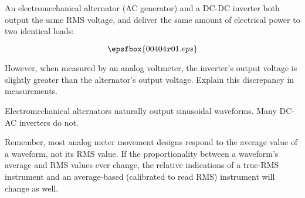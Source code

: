 

An electromechanical alternator (AC generator) and a DC-DC inverter both output the same RMS voltage, and deliver the same amount of electrical power to two identical loads:

$$\epsfbox{00404x01.eps}$$

However, when measured by an analog voltmeter, the inverter's output voltage is slightly greater than the alternator's output voltage.  Explain this discrepancy in measurements.







Electromechanical alternators naturally output sinusoidal waveforms.  Many DC-AC inverters do not.







Remember, most analog meter movement designs respond to the average value of a waveform, not its RMS value.  If the proportionality between a waveform's average and RMS values ever change, the relative indications of a true-RMS instrument and an average-based (calibrated to read RMS) instrument will change as well.




